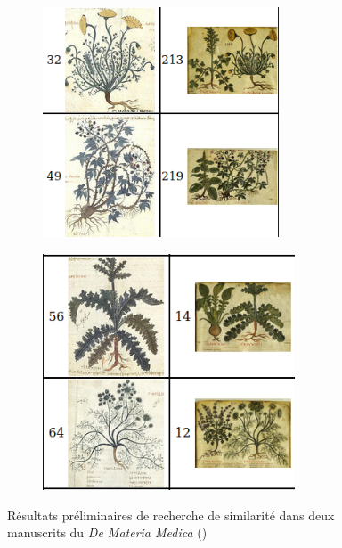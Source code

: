 \begin{figure}[h]
	\hspace{1pt}
	\begin{subfigure}{0.5\linewidth}
		\centering
		\includegraphics[width=7cm]{images/vhs_similarity.png}
	\end{subfigure}
	\hspace{1pt}
	\begin{subfigure}{0.5\linewidth}
		\centering
		\includegraphics[width=7.5cm]{images/vhs_similarity2.png}
	\end{subfigure}
	\caption{Résultats préliminaires de recherche de similarité dans deux manuscrits du \textit{De Materia Medica} (\vhs)}
	\label{fig:vhs_similarity}
\end{figure}
